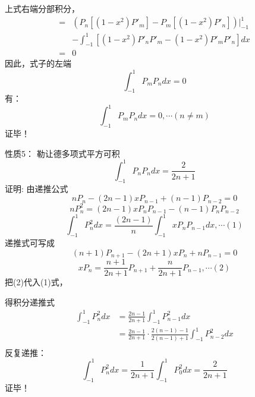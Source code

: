 	上式右端分部积分，
	\begin{equation*}
	\begin{split}
		= &(P_n [\left(1-x^{2}\right) P' _m] - P_m [\left(1-x^{2}\right) P' _n ])|_{-1} ^{1} \\ 
		&-\int_{-1}^{1}  [\left(1-x^{2}\right) P' _nP' _m -\left(1-x^{2}\right) P' _mP' _n  ]  dx \\
		=&0
	\end{split}
	\end{equation*}		
	因此，式子的左端
	\begin{equation*}
		[n(n+1) -m (m+1)]\int_{-1}^{1} P_mP_n dx =0
	\end{equation*}	
	有：
	\begin{equation*}
		\int_{-1}^{1} P_mP_n dx =0 ,\cdots (n\ne m)
	\end{equation*}	
	{\alert{证毕！}} 
	


	{\alert{性质5：}} 勒让德多项式平方可积
	\begin{equation*}
		\int_{-1}^{1} P_nP_n dx = \frac{2}{2n+1}
	\end{equation*}	
	{\alert{证明:}}  由递推公式
	\begin{equation*}
		nP_{n} -(2n-1)x P_{n-1} + (n-1)P_{n-2}  =0
	\end{equation*}		
	\begin{equation*}
		nP ^2 _{n} =(2n-1)x P_n P_{n-1} - (n-1)P_nP_{n-2} 
	\end{equation*}		
	\begin{equation*}
		\int_{-1}^{1}  P ^2 _{n} dx = \frac{(2n-1)}{n} \int_{-1}^{1}  x P_n P_{n-1} dx , \cdots (1)
	\end{equation*}	
	递推式可写成
	\begin{equation*}
		(n+1)P_{n+1} -(2n+1)x P_{n} + nP_{n-1}  =0  
	\end{equation*}		
	\begin{equation*}	
		x P_{n}=\frac{n+1}{2n+1}P_{n+1} + \frac{n}{2n+1}P_{n-1} , \cdots (2)
	\end{equation*}	
	把(2)代入(1)式，
	

	
	得积分递推式
	\begin{align*}
		\int_{-1}^{1}  P ^2 _{n} dx &=  \frac{2n-1}{2n+1}\int_{-1}^{1}   P^2_{n-1} dx \\
		&=  \frac{2n-1}{2n+1} \cdot \frac{2(n-1)-1}{2(n-1)+1} \int_{-1}^{1}   P^2_{n-2} dx \\
	\end{align*}		
	反复递推：
	\begin{equation*}
		\int_{-1}^{1}  P ^2 _{n} dx =  \frac{1}{2n+1}\int_{-1}^{1}   P^2_{0} dx = \frac{2}{2n+1}
	\end{equation*}		
	{\alert{证毕！}} 
	



